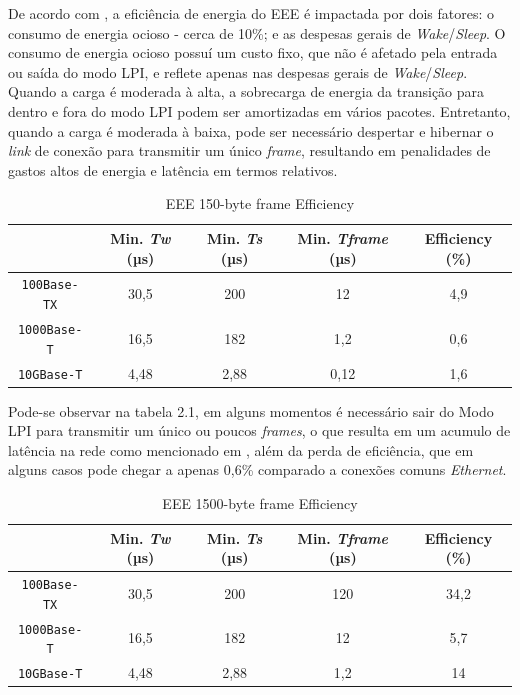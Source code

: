De acordo com \cite{reviriego2010burst}, a eficiência de energia do EEE é impactada por dois fatores: o consumo de energia ocioso - cerca de 10\%; e as despesas gerais de \emph{Wake}/\emph{Sleep}. O consumo de energia ocioso possuí um custo fixo, que não é afetado pela entrada ou saída do modo LPI, e reflete apenas nas despesas gerais de \emph{Wake}/\emph{Sleep}. Quando a carga é moderada à alta, a sobrecarga de energia da transição para dentro e fora do modo LPI podem ser amortizadas em vários pacotes. Entretanto, quando a carga é moderada à baixa, pode ser necessário despertar e hibernar o \emph{link} de conexão para transmitir um único \emph{frame}, resultando em penalidades de gastos altos de energia e latência em termos relativos.

\begin{table}[!htp]
\centering
\caption{EEE 150-byte frame Efficiency}
\label{tabela150byte}
\begin{tabular}{|c|cccc|}
\cline{2-5}
\multicolumn{1}{c|}{}& Min. \emph{Tw} (µs) &  Min. \emph{Ts} (µs) &  Min. \emph{Tframe} (µs) & Efficiency (\%) \\
\hline
\texttt{100Base-TX} & 30,5 & 200 & 12 & 4,9 \\
\hline
\texttt{1000Base-T} & 16,5 & 182 & 1,2 & 0,6 \\
\hline
\texttt{10GBase-T} & 4,48 & 2,88 & 0,12 & 1,6 \\
\hline
\end{tabular}
\end{table}

Pode-se observar na tabela 2.1, em alguns momentos é necessário sair do Modo LPI para transmitir um único ou poucos \emph{frames}, o que resulta em um acumulo de latência na rede como mencionado em \cite{reviriego2010burst}, além da perda de eficiência, que em alguns casos pode chegar a apenas 0,6\% comparado a conexões comuns \emph{Ethernet}.

\begin{table}[!htp]
\centering
\caption{EEE 1500-byte frame Efficiency}
\label{tabela1500byte}
\begin{tabular}{|c|cccc|}
\cline{2-5}
\multicolumn{1}{c|}{}& Min. \emph{Tw} (µs) &  Min. \emph{Ts} (µs) &  Min. \emph{Tframe} (µs) & Efficiency (\%) \\
\hline
\texttt{100Base-TX} & 30,5 & 200 & 120 & 34,2 \\
\hline
\texttt{1000Base-T} & 16,5 & 182 & 12 & 5,7 \\
\hline
\texttt{10GBase-T} & 4,48 & 2,88 & 1,2 & 14 \\
\hline
\end{tabular}
\end{table}

